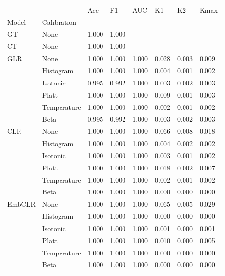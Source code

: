 \begin{tabular}{llllllll}
\toprule
 &  & Acc & F1 & AUC & K1 & K2 & Kmax \\
Model & Calibration &  &  &  &  &  &  \\
\midrule
GT & None & 1.000 & 1.000 & - & - & - & - \\
\cline{1-8}
CT & None & 1.000 & 1.000 & - & - & - & - \\
\cline{1-8}
\multirow[t]{6}{*}{GLR} & None & 1.000 & 1.000 & 1.000 & 0.028 & 0.003 & 0.009 \\
 & Histogram & 1.000 & 1.000 & 1.000 & 0.004 & 0.001 & 0.002 \\
 & Isotonic & 0.995 & 0.992 & 1.000 & 0.003 & 0.002 & 0.003 \\
 & Platt & 1.000 & 1.000 & 1.000 & 0.009 & 0.001 & 0.003 \\
 & Temperature & 1.000 & 1.000 & 1.000 & 0.002 & 0.001 & 0.002 \\
 & Beta & 0.995 & 0.992 & 1.000 & 0.003 & 0.002 & 0.003 \\
\cline{1-8}
\multirow[t]{6}{*}{CLR} & None & 1.000 & 1.000 & 1.000 & 0.066 & 0.008 & 0.018 \\
 & Histogram & 1.000 & 1.000 & 1.000 & 0.004 & 0.002 & 0.002 \\
 & Isotonic & 1.000 & 1.000 & 1.000 & 0.003 & 0.001 & 0.002 \\
 & Platt & 1.000 & 1.000 & 1.000 & 0.018 & 0.002 & 0.007 \\
 & Temperature & 1.000 & 1.000 & 1.000 & 0.002 & 0.001 & 0.002 \\
 & Beta & 1.000 & 1.000 & 1.000 & 0.000 & 0.000 & 0.000 \\
\cline{1-8}
\multirow[t]{6}{*}{EmbCLR} & None & 1.000 & 1.000 & 1.000 & 0.065 & 0.005 & 0.029 \\
 & Histogram & 1.000 & 1.000 & 1.000 & 0.000 & 0.000 & 0.000 \\
 & Isotonic & 1.000 & 1.000 & 1.000 & 0.001 & 0.000 & 0.001 \\
 & Platt & 1.000 & 1.000 & 1.000 & 0.010 & 0.000 & 0.005 \\
 & Temperature & 1.000 & 1.000 & 1.000 & 0.000 & 0.000 & 0.000 \\
 & Beta & 1.000 & 1.000 & 1.000 & 0.000 & 0.000 & 0.000 \\
\cline{1-8}
\bottomrule
\end{tabular}

